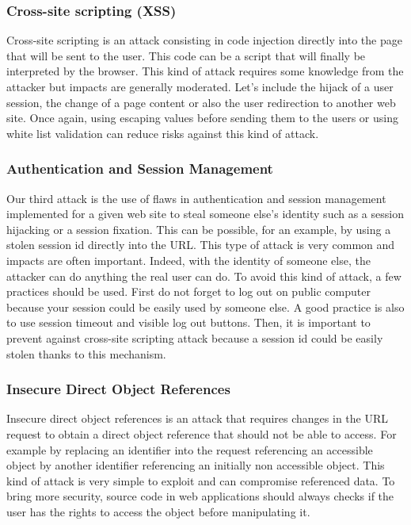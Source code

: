 \subsubsection{Cross-site scripting (XSS)}
Cross-site scripting is an attack consisting in code injection directly into the
page that will be sent to the user. This code can be a script that will finally
be interpreted by the browser. This kind of attack requires some knowledge from
the attacker but impacts are generally moderated. Let's include the hijack of a
user session, the change of a page content or also the user redirection to
another web site. Once again, using escaping values before sending them to the
users or using white list validation can reduce risks against this kind of
attack.

\subsubsection{Authentication and Session Management}
Our third attack is the use of flaws in authentication and session management
implemented for a given web site to steal someone else's identity such as a
session hijacking or a session fixation. This can be possible, for an example,
by using a stolen session id directly into the URL. This type of attack is very
common and impacts are often important. Indeed, with the identity of someone
else, the attacker can do anything the real user can do. To avoid this kind of
attack, a few practices should be used. First do not forget to log out on public
computer because your session could be easily used by someone else. A good
practice is also to use session timeout and visible log out buttons. Then, it is
important to prevent against cross-site scripting attack because a session id
could be easily stolen thanks to this mechanism.

\subsubsection{Insecure Direct Object References}
Insecure direct object references is an attack that requires changes in the URL
request to obtain a direct object reference that should not be able to access.
For example by replacing an identifier into the request referencing an
accessible object by another identifier referencing an initially non accessible
object. This kind of attack is very simple to exploit and can compromise
referenced data. To bring more security, source code in web applications should
always checks if the user has the rights to access the object before
manipulating it.

